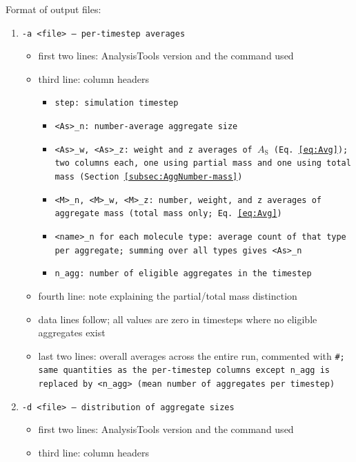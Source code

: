 \noindent
Format of output files:
\begin{enumerate}[nosep,leftmargin=20pt]
  \item \tt{-a <file>} -- per-timestep averages
    \begin{itemize}[nosep,leftmargin=5pt]
      \item first two lines: AnalysisTools version and the command used
      \item third line: column headers
        \begin{itemize}[nosep,leftmargin=10pt]
          \item \tt{step}: simulation timestep
          \item \tt{<As>_n}: number-average aggregate size
          \item \tt{<As>_w}, \tt{<As>_z}: weight and z averages of $A_\text{S}$
            (Eq.~\eqref{eq:Avg}); two columns each, one using partial mass and
            one using total mass (Section~\ref{subsec:AggNumber-mass})
          \item \tt{<M>_n}, \tt{<M>_w}, \tt{<M>_z}: number, weight, and z
            averages of aggregate mass (total mass only;
            Eq.~\eqref{eq:Avg})
          \item \tt{<name>_n} for each molecule type: average count of that
            type per aggregate; summing over all types gives \tt{<As>_n}
          \item \tt{n_agg}: number of eligible aggregates in the timestep
        \end{itemize}
      \item fourth line: note explaining the partial/total mass distinction
      \item data lines follow; all values are zero in timesteps where no
        eligible aggregates exist
      \item last two lines: overall averages across the entire run, commented
        with \tt{\#}; same quantities as the per-timestep columns except
        \tt{n_agg} is replaced by \tt{<n_agg>} (mean number of aggregates
        per timestep)
    \end{itemize}
  \item \tt{-d <file>} -- distribution of aggregate sizes
    \begin{itemize}[nosep,leftmargin=5pt]
      \item first two lines: AnalysisTools version and the command used
      \item third line: column headers
        \begin{itemize}[nosep,leftmargin=10pt]

\end{itemize}
\end{itemize}
\end{enumerate}
